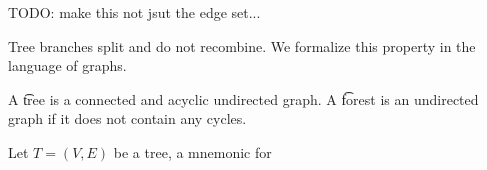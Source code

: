 
\sbasic











\sstart
{}

TODO: make this not jsut the edge set...

Tree branches split and do not recombine.
We formalize this property in the language of graphs.


A \t{tree} is a connected and acyclic undirected graph.
A \t{forest} is an undirected graph if it does not contain any cycles.




Let $T = (V, E)$ be a tree, a mnemonic for 
%

%
%

